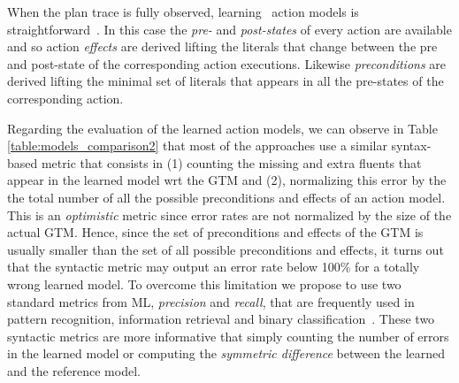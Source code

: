 When the plan trace is fully observed, learning \strips\ action models is straightforward~\cite{jimenez2012review}. In this case the {\em pre-} and {\em post-states} of every action are available and so action {\em effects} are derived lifting the literals that change between the pre and post-state of the corresponding action executions. Likewise {\em preconditions} are derived lifting the minimal set of literals that appears in all the pre-states of the corresponding action.





\vspace{0.1cm}
Regarding the evaluation of the learned action models, we can observe in Table \ref{table:models_comparison2} that most of the approaches use a similar syntax-based metric that consists in (1) counting the missing and extra fluents that appear in the learned model wrt the GTM and (2), normalizing this error by the the total number of all the possible preconditions and effects of an action model. This is an \emph{optimistic} metric since error rates are not normalized by the size of the actual GTM. Hence, since the set of preconditions and effects of the GTM is usually smaller than the set of all possible preconditions and effects, it turns out that the syntactic metric may output an error rate below 100\% for a totally wrong learned model. To overcome this limitation we propose to use two standard metrics from ML, {\em precision} and {\em recall}, that are frequently used in pattern recognition, information retrieval and binary classification~\cite{davis2006relationship}. These two syntactic metrics are more informative that simply counting the number of errors in the learned model or computing the {\em symmetric difference} between the learned and the reference model.

